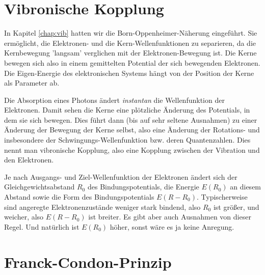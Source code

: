 \section{Vibronische Kopplung}

In Kapitel \ref{chap:vib} hatten wir die Born-Oppenheimer-Näherung eingeführt. Sie ermöglicht, die Elektronen- und die Kern-Wellenfunktionen zu separieren, da die Kernbewegung 'langsam' verglichen mit der Elektronen-Bewegung ist. Die Kerne bewegen sich also in einem gemittelten Potential der sich bewegenden Elektronen. Die Eigen-Energie des elektronischen Systems hängt von der Position der Kerne als Parameter ab.

Die Absorption eines Photons ändert \emph{instantan} die Wellenfunktion der Elektronen. Damit sehen die Kerne eine plötzliche Änderung des Potentials, in dem sie sich bewegen. Dies führt dann (bis auf sehr seltene Ausnahmen) zu einer Änderung der Bewegung der Kerne selbst, also eine Änderung der Rotations- und insbesondere der Schwingungs-Wellenfunktion bzw. deren Quantenzahlen. Dies nennt man vibronische Kopplung, also eine Kopplung zwischen der Vibration und den Elektronen.

Je nach Ausgangs- und Ziel-Wellenfunktion der Elektronen ändert sich der Gleichgewichtsabstand $R_0$ des Bindungspotentials,  die Energie $E(R_0)$ an diesem 
Abstand sowie die Form des Bindungspotentials $E(R- R_0)$. Typischerweise  sind angeregte Elektronenzustände weniger stark bindend, also $R_0$ ist größer, und weicher, also $E(R- R_0)$ ist breiter. Es gibt aber auch Ausnahmen von dieser Regel.
Und natürlich ist $E(R_0)$ höher, sonst wäre es ja keine Anregung.

\section{Franck-Condon-Prinzip}


